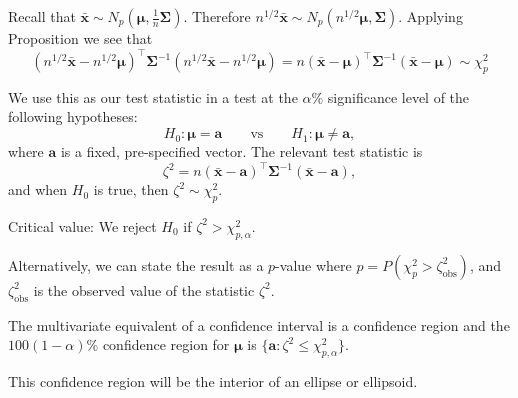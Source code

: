 \documentclass[]{book}
\theoremstyle{definition}
\theoremstyle{definition}
\theoremstyle{definition}
\theoremstyle{remark}
\begin{document}
Recall that \(\bar{\boldsymbol x} \sim N_p(\boldsymbol \mu, \frac{1}{n} \boldsymbol \Sigma)\). Therefore \(n^{1/2} \bar{\boldsymbol x} \sim N_p(n^{1/2} \boldsymbol \mu, \boldsymbol \Sigma)\). Applying Proposition we see that
\[
(n^{1/2}\bar{\boldsymbol x}-n^{1/2}\boldsymbol \mu)^\top \boldsymbol \Sigma^{-1} (n^{1/2}\bar{\boldsymbol x}-n^{1/2}\boldsymbol \mu)
=n(\bar{\boldsymbol x}-\boldsymbol \mu)^\top \boldsymbol \Sigma^{-1} (\bar{\boldsymbol x}-\boldsymbol \mu) \sim \chi_p^2
\]

We use this as our test statistic in a test at the \(\alpha\)\% significance level of the following hypotheses:
\[
H_0: \boldsymbol \mu= \boldsymbol a\qquad \text{vs} \qquad H_1: \boldsymbol \mu\neq \boldsymbol a,
\]
where \(\boldsymbol a\) is a fixed, pre-specified vector. The relevant test statistic is
\[
\zeta^2 = n(\bar{\boldsymbol x}-\boldsymbol a)^\top \boldsymbol \Sigma^{-1} (\bar{\boldsymbol x}-\boldsymbol a),
\]
and when \(H_0\) is true, then \(\zeta^2 \sim \chi_p^2\).

Critical value: We reject \(H_0\) if \(\zeta^2 > \chi^2_{p,\alpha}\).

Alternatively, we can state the result as a \(p\)-value where \(p = P(\chi^2_p > \zeta_{\text{obs}}^2)\), and
\(\zeta_{\text{obs}}^2\) is the observed value of the statistic \(\zeta^2\).

The multivariate equivalent of a confidence interval is a confidence region and the \(100(1-\alpha)\)\% confidence region for \(\boldsymbol \mu\) is \(\{ \boldsymbol a: \zeta^2 \leq \chi^2_{p,\alpha} \}\).

This confidence region will be the interior of an ellipse or ellipsoid.
\end{document}
